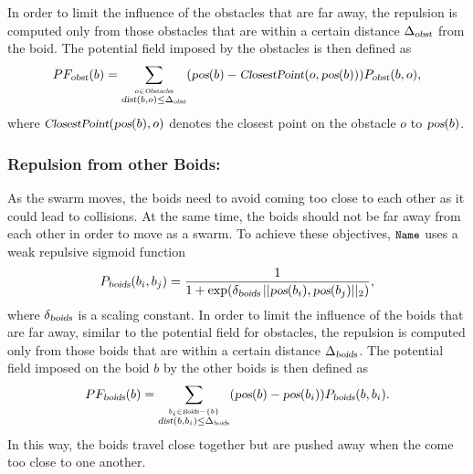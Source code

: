 \documentclass{llncs}
\newcommand{\Acronym}[1]{\ensuremath{{\small{\texttt{#1}}}}}
\newcommand{\Var}[1]{\ensuremath{{\small{\textsl{#1}}}}}
\newcommand{\Name}{\Acronym{Name}}
\begin{document}

In order to limit the influence of the obstacles that are far away,
the repulsion is computed only from those obstacles that are within a
certain distance $\Delta_\Var{obst}$ from the boid. The potential
field imposed by the obstacles is then defined as 
$$
PF_\Var{obst}(b) = \sum_{\stackrel{o \in
    \Var{Obstacles}}{\Var{dist}(b, o) \leq \Delta_\Var{obst}}} (\Var{pos}(b)
- \Var{ClosestPoint}(o, \Var{pos}(b))) P_\Var{obst}(b, o),
$$
where $\Var{ClosestPoint}(\Var{pos}(b), o)$ denotes the closest point on the
obstacle $o$ to $\Var{pos}(b)$.

\subsubsection{Repulsion from other Boids:}
\label{sec:PFboids} As the swarm moves,
the boids need to avoid coming too close to each other as it
could lead to collisions. At the same time, the boids should not be
far away from each other in order to move as a swarm. To achieve these
objectives, $\Name$ uses a weak repulsive sigmoid function
$$
P_\Var{boids}(b_i, b_j) = \frac{1}{1 +
  \exp(\delta_\Var{boids}\, ||\Var{pos}(b_i), \Var{pos}(b_j)||_2)},
$$
where $\delta_\Var{boids}$ is a scaling constant.
In order to limit the influence of the boids that are far away,
similar to the potential field for obstacles,
the repulsion is computed only from those boids that are within a
certain distance $\Delta_\Var{boids}$. The potential
field imposed on the boid $b$ by the other boids is then defined as 
$$
PF_\Var{boids}(b) = \sum_{\stackrel{b_i \in
    \Var{Boids} - \{b\}}{\Var{dist}(b, b_i) \leq \Delta_\Var{boids}}} (\Var{pos}(b)
- \Var{pos}(b_i)) P_\Var{boids}(b, b_i).
$$
In this way, the boids travel close together but are
pushed away when the come too close to one another.
\end{document}
